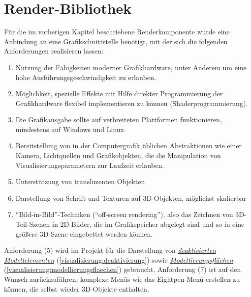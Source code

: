 \documentclass[a4paper,10pt]{sphinxmanual}
\begin{document}
\chapter{Render-Bibliothek}
\label{renderbib:render-bibliothek}\label{renderbib::doc}\label{renderbib:id1}
Für die im vorherigen Kapitel beschriebene Renderkomponente wurde eine Anbindung an eine Grafikschnittstelle benötigt, mit der sich die folgenden Anforderungen realisieren lassen:
\begin{enumerate}
\item {} 
Nutzung der Fähigkeiten moderner Grafikhardware, unter Anderem um eine hohe Ausführungsgeschwindigkeit zu erlauben.

\item {} 
Möglichkeit, spezielle Effekte mit Hilfe direkter Programmierung der Grafikhardware flexibel implementieren zu können (Shaderprogrammierung).

\item {} 
Die Grafikausgabe sollte auf verbreiteten Plattformen funktionieren, mindestens auf Windows und Linux.

\item {} 
Bereitstellung von in der Computergrafik üblichen Abstraktionen wie einer Kamera, Lichtquellen und Grafikobjekten, die die Manipulation von Visualisierungsparametern zur Laufzeit erlauben.

\item {} 
Unterstützung von transluzenten Objekten

\item {} 
Darstellung von Schrift und Texturen auf 3D-Objekten, möglichst skalierbar

\item {} 
"`Bild-in-Bild"'-Techniken ("`off-screen rendering"'), also das Zeichnen von 3D-Teil-Szenen in 2D-Bilder, die im Grafikspeicher abgelegt sind und so in eine größere 3D-Szene eingebettet werden können.

\end{enumerate}

Anforderung (5) wird im Projekt für die Darstellung von {\hyperref[visualisierung:deaktivierung]{\emph{deaktivierten Modellelementen}}} (\autoref*{visualisierung:deaktivierung}) sowie {\hyperref[visualisierung:modellierungsflaechen]{\emph{Modellierungsflächen}}} (\autoref*{visualisierung:modellierungsflaechen}) gebraucht.
Anforderung (7) ist auf den Wunsch zurückzuführen, komplexe Menüs wie das Eightpen-Menü \cite{buchi} erstellen zu können, die selbst wieder 3D-Objekte enthalten.
\end{document}
